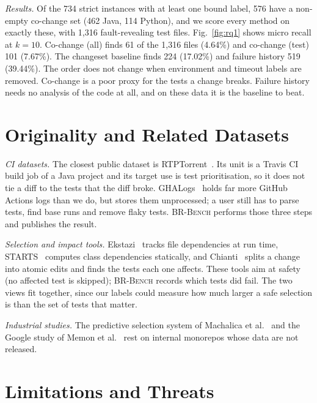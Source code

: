 \documentclass[10pt,conference]{IEEEtran}
\begin{document}
\textit{Results.} Of the 734 strict instances with at least one bound label, 576 have a non-empty co-change set (462 Java, 114 Python), and we score every method on exactly these, with 1,316 fault-revealing test files. Fig.~\ref{fig:rq1} shows micro recall at $k=10$. Co-change (all) finds 61 of the 1,316 files (4.64\%) and co-change (test) 101 (7.67\%). The changeset baseline finds 224 (17.02\%) and failure history 519 (39.44\%). The order does not change when environment and timeout labels are removed. Co-change is a poor proxy for the tests a change breaks. Failure history needs no analysis of the code at all, and on these data it is the baseline to beat.

\section{Originality and Related Datasets}
\label{sec:related}

\textit{CI datasets.} The closest public dataset is RTPTorrent~\cite{mattis2020rtptorrent}. Its unit is a Travis CI build job of a Java project and its target use is test prioritisation, so it does not tie a diff to the tests that the diff broke. GHALogs~\cite{moriconi2025ghalogs} holds far more GitHub Actions logs than we do, but stores them unprocessed; a user still has to parse tests, find base runs and remove flaky tests. \textsc{BR-Bench} performs those three steps and publishes the result.

\textit{Selection and impact tools.} Ekstazi~\cite{gligoric2015practical} tracks file dependencies at run time, STARTS~\cite{legunsen2017starts} computes class dependencies statically, and Chianti~\cite{ren2004chianti} splits a change into atomic edits and finds the tests each one affects. These tools aim at safety (no affected test is skipped); \textsc{BR-Bench} records which tests did fail. The two views fit together, since our labels could measure how much larger a safe selection is than the set of tests that matter.

\textit{Industrial studies.} The predictive selection system of Machalica et al.~\cite{machalica2019predictive} and the Google study of Memon et al.~\cite{memon2017taming} rest on internal monorepos whose data are not released.

\section{Limitations and Threats}
\label{sec:limits}
\end{document}
